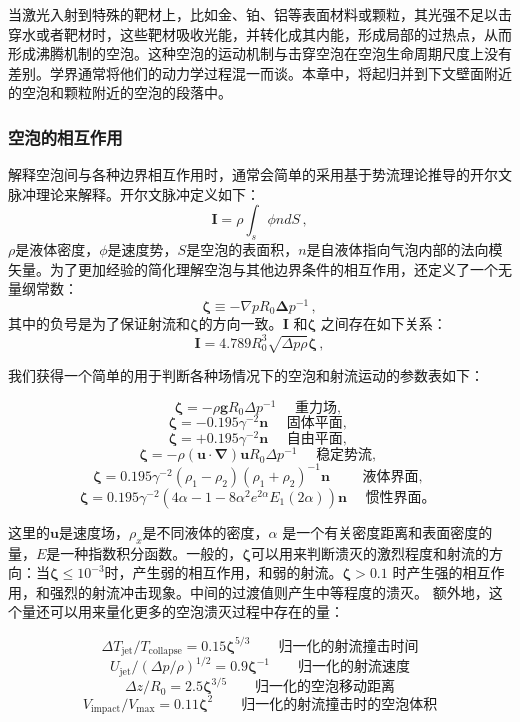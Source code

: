 当激光入射到特殊的靶材上，比如金、铂、铝等表面材料或颗粒，其光强不足以击穿水或者靶材时，这些靶材吸收光能，并转化成其内能，形成局部的过热点，从而形成沸腾机制的空泡\cite{welch_pulsed_2010,venugopalan_thermodynamic_1996,miotello_critical_1995,venugopalan_effect_1994,miotello_laser-induced_1999}。这种空泡的运动机制与击穿空泡在空泡生命周期尺度上没有差别。学界通常将他们的动力学过程混一而谈。本章中，将起归并到下文壁面附近的空泡和颗粒附近的空泡的段落中。
\medskip
\bigskip
\subsubsection{空泡的相互作用}\label{chapter1.2.2.2}

解释空泡间与各种边界相互作用时，通常会简单的采用基于势流理论推导的开尔文脉冲理论来解释\cite{Blake1987,zhang_unified_2023,blake_kelvin_1988,blake_cavitation_2015}。开尔文脉冲定义如下：
$$\bm I=\rho\int_{s}\phi ndS\,,$$
$\rho $是液体密度，$\phi$是速度势，$ S $是空泡的表面积，$n$是自液体指向气泡内部的法向模矢量。为了更加经验的简化理解空泡与其他边界条件的相互作用，还定义了一个无量纲常数：
$$\bm{\zeta} \equiv -\nabla p R_0 {\bm{\Delta}} p^{-1}\,,$$
其中的负号是为了保证射流和${\bm{\zeta}}$的方向一致。${\bm{I}}$ 和${\bm{\zeta}}$ 之间存在如下关系：
$${\bm{I}}=4.789R_0^3\sqrt{\Delta p \rho}{\bm{\zeta}}\,,$$

我们获得一个简单的用于判断各种场情况下的空泡和射流运动的参数表如下\cite{supponen_scaling_2016}：


$$\bm\zeta=-\rho \bm g R_{0} \Delta p^{-1} \quad \text { 重力场, }$$
$$\bm\zeta=-0.195 \gamma^{-2} \bm n \quad \text { 固体平面, }$$
$$\bm\zeta=+0.195 \gamma^{-2} \bm n \quad \text { 自由平面, }$$
$$\bm\zeta=-\rho(\bm u \cdot \bm \nabla) \bm u R_{0} \Delta p^{-1} \quad\text { 稳定势流, }$$
$$\bm\zeta=0.195 \gamma^{-2}\left(\rho_{1}-\rho_{2}\right)\left(\rho_{1}+\rho_{2}\right)^{-1} \boldsymbol{n} \quad\quad \text { 液体界面, }$$
$$\bm\zeta=0.195 \gamma^{-2}\left(4 \alpha-1-8 \alpha^{2} e^{2 \alpha} E_{1}(2 \alpha)\right) \bm n \quad \text { 惯性界面。 }$$

这里的$\bm u$是速度场，$\rho_x$是不同液体的密度，$\alpha$ 是一个有关密度距离和表面密度的量，$E$是一种指数积分函数。一般的，$\bm{\zeta}$可以用来判断溃灭的激烈程度和射流的方向：当$\bm \zeta\le{10}^{-3}$时，产生弱的相互作用，和弱的射流。$\bm \zeta>0.1$ 时产生强的相互作用，和强烈的射流冲击现象。中间的过渡值则产生中等程度的溃灭。
额外地，这个量还可以用来量化更多的空泡溃灭过程中存在的量：

$$ \Delta T_\mathrm{jet} / T_\mathrm{collapse}=0.15 \bm{\zeta}^{5/3}  \qquad \text{归一化的射流撞击时间}$$
$$ U_{\mathrm{jet}}/(\Delta p /\rho )^{1/2}=0.9\bm \zeta^{-1} \qquad \text{归一化的射流速度}$$
$$ \Delta z / R_0 =2.5 \bm \zeta^{3/5}\qquad \text{归一化的空泡移动距离}$$
$$V_\mathrm{impact}/V_\mathrm{max}=0.11\bm\zeta^2 \qquad \text{归一化的射流撞击时的空泡体积}$$

